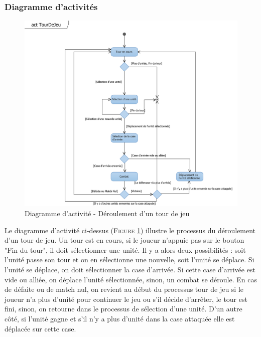 \documentclass[a4paper,11pt]{article}
\begin{document}
		\subsubsection{Diagramme d'activités}
			\begin{figure}[ht!]
				\includegraphics{Diagrammes/Tour/actTourDeJeu.png}
				\caption{Diagramme d'activité - Déroulement d'un tour de jeu}
				\label{fig:acttour}
				\end{figure}
			\vspace*{1cm}
			Le diagramme d'activité ci-dessus (\textsc{Figure \ref{fig:acttour}}) illustre le processus du déroulement d'un tour de jeu. Un tour est en cours, si le joueur n'appuie pas sur le bouton "Fin du tour", il doit sélectionner une unité. Il y a alors deux possibilités : soit l'unité passe son tour et on en sélectionne une nouvelle, soit l'unité se déplace. Si l'unité se déplace, on doit sélectionner la case d'arrivée. Si cette case d'arrivée est vide ou alliée, on déplace l'unité sélectionnée, sinon, un combat se déroule. En cas de défaite ou de match nul, on revient au début du processus tour de jeu si le joueur n'a plus d'unité pour continuer le jeu ou s'il décide d'arrêter, le tour est fini, sinon, on retourne dans le processus de sélection d'une unité. D'un autre côté, si l'unité gagne et s'il n'y a plus d'unité dans la case attaquée elle est déplacée sur cette case.
			\newpage
\end{document}

